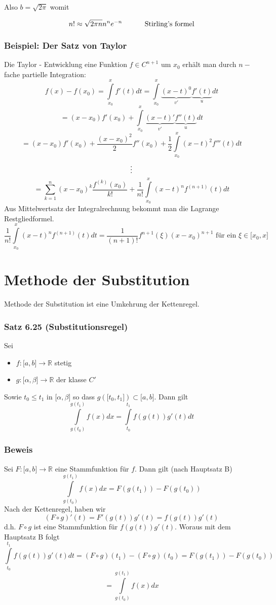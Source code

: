 Also $b=\sqrt{2\pi}$ womit 
\begin{framed}
\[n! \approx \sqrt {2\pi n} {n^n}{e^{ - n}}\text{\hspace{10mm} Stirling's formel}\]
\end{framed}
\subsubsection*{Beispiel: Der Satz von Taylor}
Die Taylor - Entwicklung eine Funktion $f\in C^{n+1}$ um $x_0$ erhält man durch $n-$fache partielle Integration:
\[f(x) - f({x_0}) = \int\limits_{{x_0}}^x {f'(t)dt = } \int\limits_{{x_0}}^x {\underbrace {{{(x - t)}^0}}_{v'}\underbrace {f'(t)}_udt} \]
\[ = (x - {x_0})f'({x_0}) + \int\limits_{{x_0}}^x {\underbrace {(x - t)'}_{v'}} \underbrace {f''(t)}_udt\]
\[ = (x - {x_0})f'({x_0}) + \frac{{{{(x - {x_0})}^2}}}{2}f''({x_0}) + \frac{1}{2}\int\limits_{{x_0}}^x {{{(x - t)}^2}f'''(t)dt} \]
$$\text{\vdots}$$
\[ = \sum\limits_{k = 1}^n {{{(x - {x_0})}^k}\frac{{{f^{(k)}}({x_0})}}{{k!}}}  + \frac{1}{{n!}}\int\limits_{{x_0}}^x {{{(x - t)}^n}{f^{(n + 1)}}(t)dt} \]
Aus Mittelwertsatz der Integralrechnung bekommt man die Lagrange Restgliedformel.
\[\frac{1}{{n!}}\int\limits_{{x_0}}^x {{{(x - t)}^n}{f^{(n + 1)}}(t)dt}  = \frac{1}{{(n + 1)!}}{f^{n + 1}}(\xi ){(x - {x_0})^{n + 1}}\text{ für ein }\xi\in\lbrack x_0,x\rbrack\]
\newpage
\section{Methode der Substitution}
Methode der Substitution ist eine Umkehrung der Kettenregel.
\subsubsection*{Satz 6.25 (Substitutionsregel)}
Sei 
\begin{itemize}
\item $f:\lbrack a,b\rbrack\rightarrow\mathbb{R}$ stetig
\item $g:\lbrack\alpha,\beta\rbrack\rightarrow\mathbb{R}$ der klasse $C'$
\end{itemize}
Sowie $t_0\leq t_1$ in $\lbrack\alpha,\beta\rbrack$ so dass $g\left(\lbrack t_0, t_1\rbrack\right)\subset\lbrack a,b\rbrack$.
Dann gilt 
\[\int\limits_{g({t_0})}^{g({t_1})} {f(x)dx = \int\limits_{{t_0}}^{{t_1}} {f\left( {g\left( t \right)} \right)g'\left( t \right)dt} } \]

\subsubsection*{Beweis}
Sei $F:\lbrack a,b\rbrack\rightarrow\mathbb{R}$ eine Stammfunktion für $f$. Dann gilt (nach Hauptsatz B)
\[\int\limits_{g({t_0})}^{g({t_1})} {f(x)dx = F\left( {g({t_1})} \right)}  - F\left( {g({t_0})} \right)\]
Nach der Kettenregel, haben wir
\[(F \circ g)'(t) = F'(g(t))g'(t) = f(g(t))g'(t)\]
d.h. $F\circ g$ ist eine Stammfunktion für $f(g(t))g'(t)$. Woraus mit dem Hauptsatz B folgt 
\[\int\limits_{{t_0}}^{{t_1}} {f\left( {g(t)} \right)} g'(t)dt = \left( {F \circ g} \right)({t_1}) - \left( {F \circ g} \right)({t_0}) = F\left( {g({t_1})} \right) - F\left( {g({t_0})} \right)\]
\[ = \int\limits_{g({t_0})}^{g({t_1})} {f(x)dx} \]

